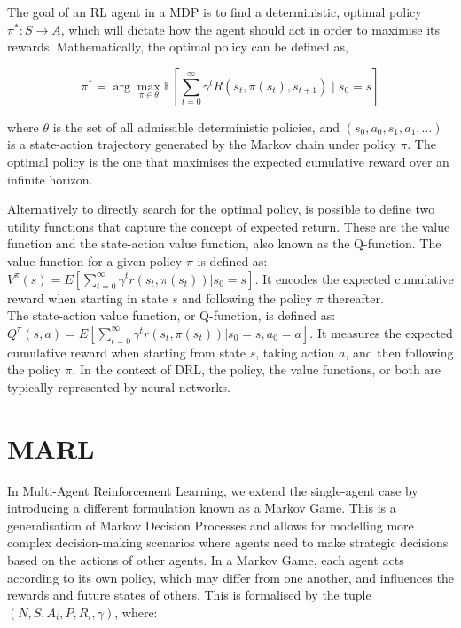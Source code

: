\documentclass[a4paper,singleside,12pt]{report} %
\begin{document}
The goal of an RL agent in a MDP is to find a deterministic, optimal policy \(\pi^*: S \rightarrow A\), which will dictate how the agent should act in order to maximise its rewards. Mathematically, the optimal policy can be defined as,

\begin{equation}
\pi^* = \arg \max_{\pi \in \theta} \mathbb{E}[\sum_{t=0}^{\infty} \gamma^t R(s_t, \pi(s_t), s_{t+1}) \mid s_0 = s]
\end{equation}

where \(\theta\) is the set of all admissible deterministic policies, and \((s_0, a_0, s_1, a_1, \dots)\) is a state-action trajectory generated by the Markov chain under policy \(\pi\). The optimal policy is the one that maximises the expected cumulative reward over an infinite horizon.

Alternatively to directly search for the optimal policy, is possible to define two utility functions that capture the concept of expected return. These are the value function and the state-action value function, also known as the Q-function. The value function for a given policy \(\pi\) is defined as:\\
${V^{\pi}(s) = E [\sum_{t=0}^{\infty} \gamma^tr(s_t, \pi(s_t))|s_0 = s]}$.
It encodes the expected cumulative reward when starting in state \(s\) and following the policy \(\pi\) thereafter.\\
The state-action value function, or Q-function, is defined as: \\
${Q^{\pi}(s, a) = E [\sum_{t=0}^{\infty} \gamma^tr(s_t, \pi(s_t))|s_0 = s, a_0 = a]}$.
It measures the expected cumulative reward when starting from state \(s\), taking action \(a\), and then following the policy \(\pi\). In the context of DRL, the policy, the value functions, or both are typically represented by neural networks.

\section{MARL}\label{marl}

In Multi-Agent Reinforcement Learning, we extend the single-agent case by introducing a different formulation known as a Markov Game. This is a generalisation of Markov Decision Processes and allows for modelling more complex decision-making scenarios where agents need to make strategic decisions based on the actions of other agents. In a Markov Game, each agent acts according to its own policy, which may differ from one another, and influences the rewards and future states of others. This is formalised by the tuple \((N, S, {A_i}, P, {R_i}, \gamma)\), where:
\end{document}
